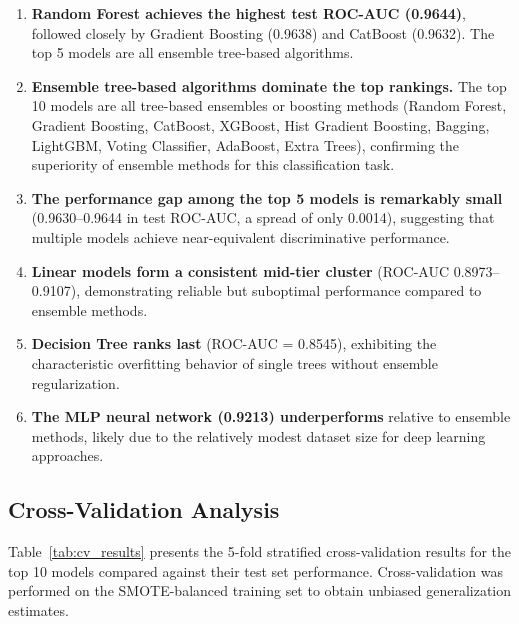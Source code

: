 \documentclass[conference,10pt]{IEEEtran}
\begin{document}
\begin{enumerate}
    \item \textbf{Random Forest achieves the highest test ROC-AUC (0.9644)}, followed closely by Gradient Boosting (0.9638) and CatBoost (0.9632). The top 5 models are all ensemble tree-based algorithms.

    \item \textbf{Ensemble tree-based algorithms dominate the top rankings.} The top 10 models are all tree-based ensembles or boosting methods (Random Forest, Gradient Boosting, CatBoost, XGBoost, Hist Gradient Boosting, Bagging, LightGBM, Voting Classifier, AdaBoost, Extra Trees), confirming the superiority of ensemble methods for this classification task.

    \item \textbf{The performance gap among the top 5 models is remarkably small} (0.9630--0.9644 in test ROC-AUC, a spread of only 0.0014), suggesting that multiple models achieve near-equivalent discriminative performance.

    \item \textbf{Linear models form a consistent mid-tier cluster} (ROC-AUC 0.8973--0.9107), demonstrating reliable but suboptimal performance compared to ensemble methods.

    \item \textbf{Decision Tree ranks last} (ROC-AUC = 0.8545), exhibiting the characteristic overfitting behavior of single trees without ensemble regularization.

    \item \textbf{The MLP neural network (0.9213) underperforms} relative to ensemble methods, likely due to the relatively modest dataset size for deep learning approaches.
\end{enumerate}

\subsection{Cross-Validation Analysis}
\label{subsec:cv_analysis}

Table~\ref{tab:cv_results} presents the 5-fold stratified cross-validation results for the top 10 models compared against their test set performance. Cross-validation was performed on the SMOTE-balanced training set to obtain unbiased generalization estimates.
\end{document}
